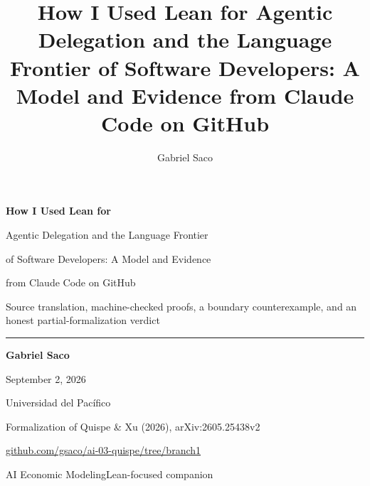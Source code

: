 \documentclass[aspectratio=169,9pt]{beamer}
\title{How I Used Lean for Agentic Delegation and the Language Frontier of Software Developers: A Model and Evidence from Claude Code on GitHub}
\author{Gabriel Saco}
\begin{document}
\begin{frame}[plain]
  \vspace*{0.66cm}
  {\fontsize{14.7}{17.2}\selectfont\bfseries
    How I Used Lean for\par
    Agentic Delegation and the Language Frontier\par
    of Software Developers: A Model and Evidence\par
    from Claude Code on GitHub\par}
  \vspace{0.18cm}
  {\fontsize{10.8}{13.0}\selectfont
    Source translation, machine-checked proofs, a boundary counterexample,
    and an honest partial-formalization verdict\par}
  \vspace{0.28cm}
  {\color{QXRed}\rule{\linewidth}{0.55pt}}
  \vspace{0.38cm}
  {\normalsize\bfseries Gabriel Saco\par}
  \vspace{0.05cm}
  {\normalsize September 2, 2026\par}
  \vspace{0.16cm}
  {\small Universidad del Pac\'ifico\par}
  \vspace{0.18cm}
  {\small\color{QXMuted}
    Formalization of Quispe \& Xu (2026), arXiv:2605.25438v2\par}
  \vspace{0.08cm}
  {\small\href{https://github.com/gsaco/ai-03-quispe/tree/branch1}{\color{QXNavy}\ttfamily
    github.com/gsaco/ai-03-quispe/tree/branch1}\par}
  \vfill
  {\scriptsize\color{QXMuted}AI Economic Modeling\hfill Lean-focused companion\par}
\end{frame}
\end{document}
